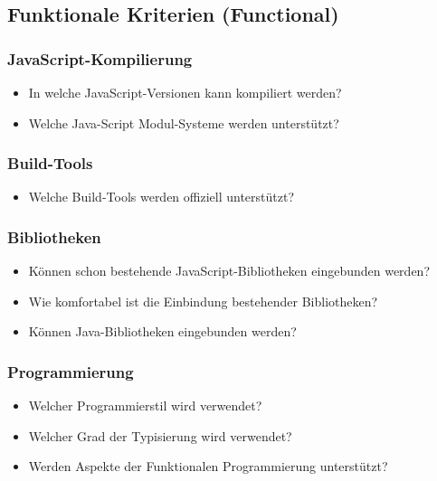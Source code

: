 \subsection{Funktionale Kriterien (Functional)}\label{sec:functionalCriteria}
\subsubsection{JavaScript-Kompilierung}
\begin{itemize}
	\item In welche JavaScript-Versionen kann kompiliert werden?
	\item Welche Java-Script Modul-Systeme werden unterstützt?
\end{itemize}

\subsubsection{Build-Tools}
\begin{itemize}
	\item Welche Build-Tools werden offiziell unterstützt?
\end{itemize}

\subsubsection{Bibliotheken}
\begin{itemize}
	\item Können schon bestehende JavaScript-Bibliotheken eingebunden werden?
	\item Wie komfortabel ist die Einbindung bestehender Bibliotheken?
	\item Können Java-Bibliotheken eingebunden werden?
\end{itemize}

\subsubsection{Programmierung}
\begin{itemize}
	\item Welcher Programmierstil wird verwendet?
	\item Welcher Grad der Typisierung wird verwendet?
	\item Werden Aspekte der Funktionalen Programmierung unterstützt?
\end{itemize}

